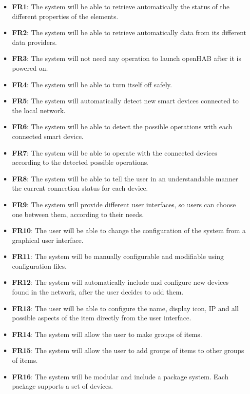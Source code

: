 \begin{itemize}
    \item \textbf{FR1}: The system will be able to retrieve automatically the status of the different properties of the elements.
    \item \textbf{FR2}: The system will be able to retrieve automatically data from its different data providers.
    \item \textbf{FR3}: The system will not need any operation to launch openHAB after it is powered on.
    \item \textbf{FR4}: The system will be able to turn itself off safely.
    \item \textbf{FR5}: The system will automatically detect new smart devices connected to the local network.
    \item \textbf{FR6}: The system will be able to detect the possible operations with each connected smart device.
    \item \textbf{FR7}: The system will be able to operate with the connected devices according to the detected possible operations.
    \item \textbf{FR8}: The system will be able to tell the user in an understandable manner the current connection status for each
    device.
    \item \textbf{FR9}: The system will provide different user interfaces, so users can choose one between them, according to
    their needs.
    \item \textbf{FR10}: The user will be able to change the configuration of the system from a graphical user interface.
    \item \textbf{FR11}: The system will be manually configurable and modifiable using configuration files.
    \item \textbf{FR12}: The system will automatically include and configure new devices found in the network, after the user decides
    to add them.
    \item \textbf{FR13}: The user will be able to configure the name, display icon, IP and all possible aspects of the item directly from
    the user interface.
    \item \textbf{FR14}: The system will allow the user to make groups of items.
    \item \textbf{FR15}: The system will allow the user to add groups of items to other groups of items.
    \item \textbf{FR16}: The system will be modular and include a package system. Each package supports a set of devices.

\end{itemize}
